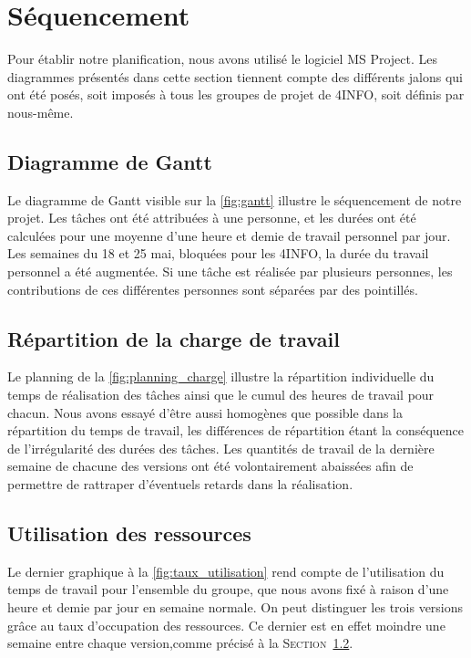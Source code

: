 \section{Séquencement}
	\label{sec:sequencement}
	Pour établir notre planification, nous avons utilisé le logiciel MS Project. Les diagrammes présentés dans cette section tiennent compte des différents jalons qui ont été posés, soit imposés à tous les groupes de projet de 4INFO, soit définis par nous-même.

    \subsection{Diagramme de Gantt}
        Le diagramme de Gantt visible sur la \ffigure{} \ref{fig:gantt} illustre le séquencement de notre projet. Les tâches ont été attribuées à une personne, et les durées ont été calculées pour une moyenne d'une heure et demie de travail personnel par jour. Les semaines du 18 et 25 mai, bloquées pour les 4INFO, la durée du travail personnel a été augmentée. Si une tâche est réalisée par plusieurs personnes, les contributions de ces différentes personnes sont séparées par des pointillés.
    
    \subsection{Répartition de la charge de travail}
    \label{subsec:repartition_charge}
        Le planning de la \ffigure{} \ref{fig:planning_charge} illustre la répartition individuelle du temps de réalisation des tâches ainsi que le cumul des heures de travail pour chacun. Nous avons essayé d'être aussi homogènes que possible dans la répartition du temps de travail, les différences de répartition étant la conséquence de l'irrégularité des durées des tâches. Les quantités de travail de la dernière semaine de chacune des versions ont été volontairement abaissées afin de permettre de rattraper d'éventuels retards dans la réalisation.
    

	\subsection{Utilisation des ressources}
		Le dernier graphique à la \ffigure{} \ref{fig:taux_utilisation} rend compte de l'utilisation du temps de travail pour l'ensemble du groupe, que nous avons fixé à raison d'une heure et demie par jour en semaine normale. On peut distinguer les trois versions grâce au taux d'occupation des ressources. Ce dernier est en effet moindre une semaine entre chaque version,comme précisé à la \textsc{Section}~\ref{subsec:repartition_charge}.

